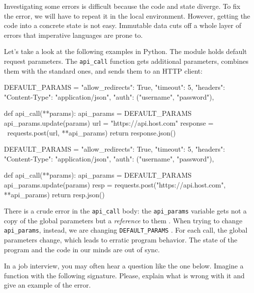Investigating some errors is difficult because the code and state diverge. To fix the error, we will have to repeat it in the local environment. However, getting the code into a concrete state is not easy. Immutable data cuts off a whole layer of errors that imperative languages are prone to.


Let’s take a look at the following examples in Python. The module holds default request parameters. The \verb|api_call| function gets additional parameters, combines them with the standard ones, and sends them to an HTTP client:

\ifx\DEVICETYPE\MOBILE

\begin{python/lines}
DEFAULT_PARAMS = {
    "allow_redirects": True,
    "timeout": 5,
    "headers": {"Content-Type":
                "application/json"},
    "auth": ("username", "password"),
}

def api_call(**params):
    api_params = DEFAULT_PARAMS
    api_params.update(params)
    url = "https://api.host.com"
    response = \
      requests.post(url, **api_params)
    return response.json()
\end{python/lines}

\else

\begin{python/lines}
DEFAULT_PARAMS = {
    "allow_redirects": True,
    "timeout": 5,
    "headers": {"Content-Type": "application/json"},
    "auth": ("username", "password"),
}

def api_call(**params):
    api_params = DEFAULT_PARAMS
    api_params.update(params)
    resp = requests.post("https://api.host.com", **api_params)
    return resp.json()
\end{python/lines}

\fi


There is a crude error in the \verb|api_call| body: the \verb|api_params| variable gets not a copy of the global parameters but a \emph{reference} to them \ifx\DEVICETYPE\MOBILE{}\else{}\fi. When trying to change \verb|api_params|, instead, we are changing \verb|DEFAULT_PARAMS|
\ifx\DEVICETYPE\MOBILE\coderef{11}\else\coderef{10}\fi. For each call, the global parameters change, which leads to erratic program behavior.
The state of the program and the code in our minds are out of sync.

In a job interview, you may often hear a question like the one below. Imagine a function with the following signature. Please, explain what is wrong with it and give an example of the error.


